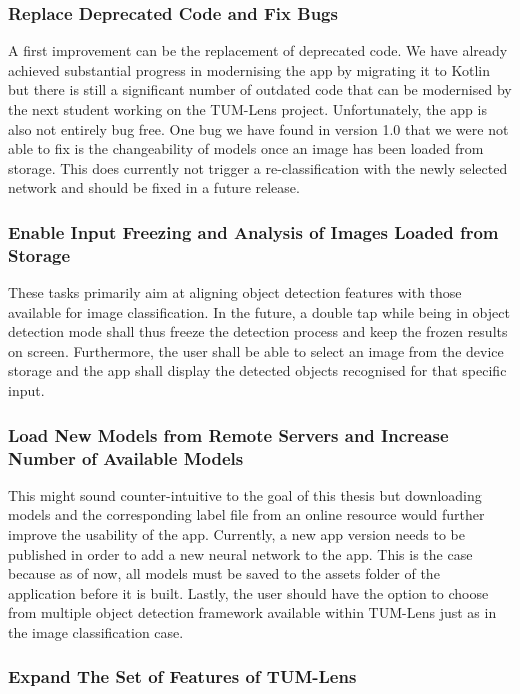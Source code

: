 \documentclass[
			   fontsize=11pt,
               paper=a4,
               bibliography=totoc,
               idxtotoc,
               headsepline,
               footsepline,
               footinclude=false,
               BCOR=12mm,
               DIV=13,
               openany,   %
               oneside    %
               ]
               {scrbook}
\begin{document}
\subsubsection{Replace Deprecated Code and Fix Bugs}
A first improvement can be the replacement of deprecated code. We have already achieved substantial progress in modernising the app by migrating it to Kotlin but there is still a significant number of outdated code that can be modernised by the next student working on the TUM-Lens project. Unfortunately, the app is also not entirely bug free. One bug we have found in version 1.0 that we were not able to fix is the changeability of models once an image has been loaded from storage. This does currently not trigger a re-classification with the newly selected network and should be fixed in a future release.

\subsubsection{Enable Input Freezing and Analysis of Images Loaded from Storage}
These tasks primarily aim at aligning object detection features with those available for image classification. In the future, a double tap while being in object detection mode shall thus freeze the detection process and keep the frozen results on screen. Furthermore, the user shall be able to select an image from the device storage and the app shall display the detected objects recognised for that specific input.

\subsubsection{Load New Models from Remote Servers and Increase Number of Available Models}
This might sound counter-intuitive to the goal of this thesis but downloading models and the corresponding label file from an online resource would further improve the usability of the app. Currently, a new app version needs to be published in order to add a new neural network to the app. This is the case because as of now, all models must be saved to the assets folder of the application before it is built. Lastly, the user should have the option to choose from multiple object detection framework available within TUM-Lens just as in the image classification case.

\subsubsection{Expand The Set of Features of TUM-Lens}
\end{document}
